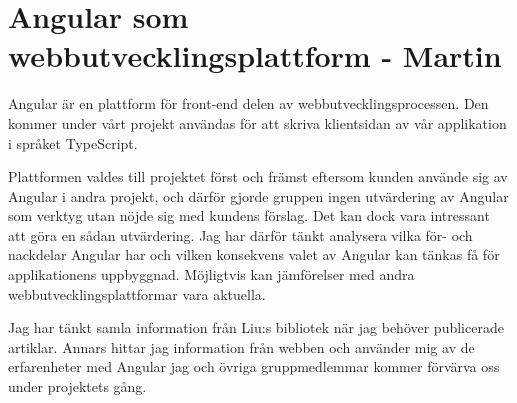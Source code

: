 \chapter{Angular som webbutvecklingsplattform - Martin}

Angular är en plattform för front-end delen av webbutvecklingsprocessen. Den kommer under vårt projekt användas för att skriva klientsidan av vår applikation i språket TypeScript.

Plattformen valdes till projektet först och främst eftersom kunden använde sig av Angular i andra projekt, och därför gjorde gruppen ingen utvärdering av Angular som verktyg utan nöjde sig med kundens förslag. Det kan dock vara intressant att göra en sådan utvärdering. Jag har därför tänkt analysera vilka för- och nackdelar Angular har och vilken konsekvens valet av Angular kan tänkas få för applikationens uppbyggnad. Möjligtvis kan jämförelser med andra webbutvecklingsplattformar vara aktuella.

Jag har tänkt samla information från Liu:s bibliotek när jag behöver publicerade artiklar. Annars hittar jag information från webben och använder mig av de erfarenheter med Angular jag och övriga gruppmedlemmar kommer förvärva oss under projektets gång.
